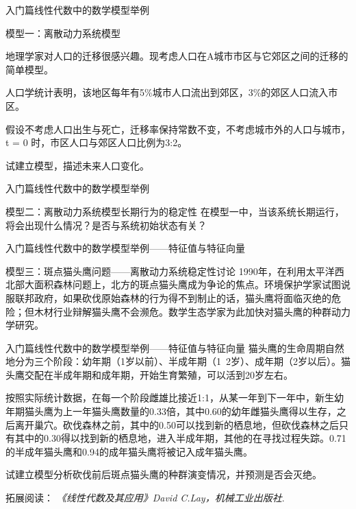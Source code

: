 \documentclass{beamer}
\begin{document}
\begin{frame}{入门篇}{线性代数中的数学模型举例}
\begin{block}{模型一：离散动力系统模型}

地理学家对人口的迁移很感兴趣。现考虑人口在A城市市区与它郊区之间的迁移的简单模型。

人口学统计表明，该地区每年有5\%城市人口流出到郊区，3\%的郊区人口流入市区。

假设不考虑人口出生与死亡，迁移率保持常数不变，不考虑城市外的人口与城市，t = 0 时，市区人口与郊区人口比例为3:2。

试建立模型，描述未来人口变化。
\end{block}
\end{frame}

\begin{frame}{入门篇}{线性代数中的数学模型举例}
\begin{block}{模型二：离散动力系统模型长期行为的稳定性}
在模型一中，当该系统长期运行，将会出现什么情况？是否与系统初始状态有关？
\end{block}
\end{frame}

\begin{frame}{入门篇}{线性代数中的数学模型举例——特征值与特征向量}
\begin{block}{模型三：斑点猫头鹰问题——离散动力系统稳定性讨论}
1990年，在利用太平洋西北部大面积森林问题上，北方的斑点猫头鹰成为争论的焦点。环境保护学家试图说服联邦政府，如果砍伐原始森林的行为得不到制止的话，猫头鹰将面临灭绝的危险；但木材行业辩解猫头鹰不会濒危。数学生态学家为此加快对猫头鹰的种群动力学研究。
\end{block}
\end{frame}

\begin{frame}{入门篇}{线性代数中的数学模型举例——特征值与特征向量}
猫头鹰的生命周期自然地分为三个阶段：幼年期（1岁以前）、半成年期（1~2岁）、成年期（2岁以后）。猫头鹰交配在半成年期和成年期，开始生育繁殖，可以活到20岁左右。

按照实际统计数据，在每一个阶段雌雄比接近1:1，从某一年到下一年中，新生幼年期猫头鹰为上一年猫头鹰数量的0.33倍，其中0.60的幼年雌猫头鹰得以生存，之后离开巢穴。砍伐森林之前，其中的0.50可以找到新的栖息地，但砍伐森林之后只有其中的0.30得以找到新的栖息地，进入半成年期，其他的在寻找过程失踪。0.71的半成年猫头鹰和0.94的成年猫头鹰将被记入成年猫头鹰。

试建立模型分析砍伐前后斑点猫头鹰的种群演变情况，并预测是否会灭绝。

\footnotesize 拓展阅读：
\emph{《线性代数及其应用》David C.Lay，机械工业出版社}.
\end{frame}
\end{document}
